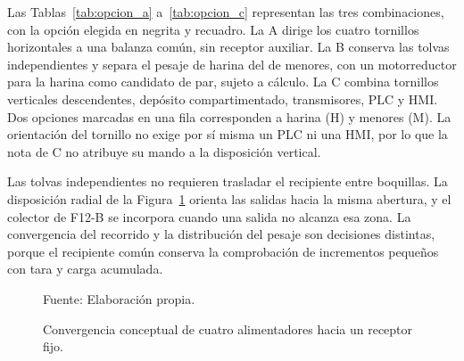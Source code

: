 Las Tablas~\ref{tab:opcion_a} a~\ref{tab:opcion_c} representan las tres
combinaciones, con la opción elegida en negrita y recuadro. La A dirige
los cuatro tornillos horizontales a una balanza común, sin receptor
auxiliar. La B conserva las tolvas independientes y separa el pesaje de
harina del de menores, con un motorreductor para la harina como candidato
de par, sujeto a cálculo. La C combina tornillos verticales descendentes,
depósito compartimentado, transmisores, PLC y HMI. Dos opciones marcadas
en una fila corresponden a harina (H) y menores (M). La orientación del
tornillo no exige por sí misma un PLC ni una HMI, por lo que la nota de C
no atribuye su mando a la disposición vertical.



Las tolvas independientes no requieren trasladar el recipiente entre
boquillas. La disposición radial de la
Figura~\ref{fig:convergencia_receptor} orienta las salidas hacia la
misma abertura, y el colector de F12-B se incorpora cuando una salida no
alcanza esa zona. La convergencia del recorrido y la distribución del
pesaje son decisiones distintas, porque el recipiente común conserva la
comprobación de incrementos pequeños con tara y carga acumulada.

\begin{figure}[H]
    \centering
    \caption{Convergencia conceptual de cuatro alimentadores hacia un receptor fijo.}
    \label{fig:convergencia_receptor}
    {\footnotesize Fuente: Elaboración propia.}
\end{figure}

